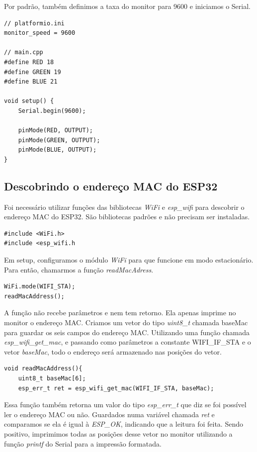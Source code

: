 \documentclass[12pt]{article}
\begin{document}
Por padrão, também definimos a taxa do monitor para 9600 e iniciamos o Serial.

\begin{lstlisting}
// platformio.ini
monitor_speed = 9600

// main.cpp
#define RED 18
#define GREEN 19
#define BLUE 21

void setup() {
    Serial.begin(9600);

    pinMode(RED, OUTPUT);
    pinMode(GREEN, OUTPUT);
    pinMode(BLUE, OUTPUT);
}
\end{lstlisting}

\subsection{Descobrindo o endereço MAC do ESP32}

Foi necessário utilizar funções das bibliotecas \textit{WiFi} e \textit{esp\_wifi} para descobrir o endereço MAC do ESP32. São bibliotecas padrões e não precisam ser instaladas.

\begin{lstlisting}
#include <WiFi.h>
#include <esp_wifi.h
\end{lstlisting}

Em setup, configuramos o módulo \textit{WiFi} para que funcione em modo estacionário. Para então, chamarmos a função \textit{readMacAdress}.

\begin{lstlisting}
WiFi.mode(WIFI_STA);
readMacAddress();
\end{lstlisting}

A função não recebe parâmetros e nem tem retorno. Ela apenas imprime no monitor o endereço MAC. Criamos um vetor do tipo \textit{uint8\_t} chamada baseMac para guardar os seis campos do endereço MAC. Utilizando uma função chamada \textit{esp\_wifi\_get\_mac}, e passando como parâmetros a constante WIFI\_IF\_STA e o vetor \textit{baseMac}, todo o endereço será armazenado nas posições do vetor.

\begin{lstlisting}
void readMacAddress(){
    uint8_t baseMac[6];
    esp_err_t ret = esp_wifi_get_mac(WIFI_IF_STA, baseMac);
\end{lstlisting}

Essa função também retorna um valor do tipo \textit{esp\_err\_t} que diz se foi possível ler o endereço MAC ou não. Guardados numa variável chamada \textit{ret} e comparamos se ela é igual à \textit{ESP\_OK}, indicando que a leitura foi feita. Sendo positivo, imprimimos todas as posições desse vetor no monitor utilizando a função \textit{printf} do Serial para a impressão formatada. 
\end{document}

